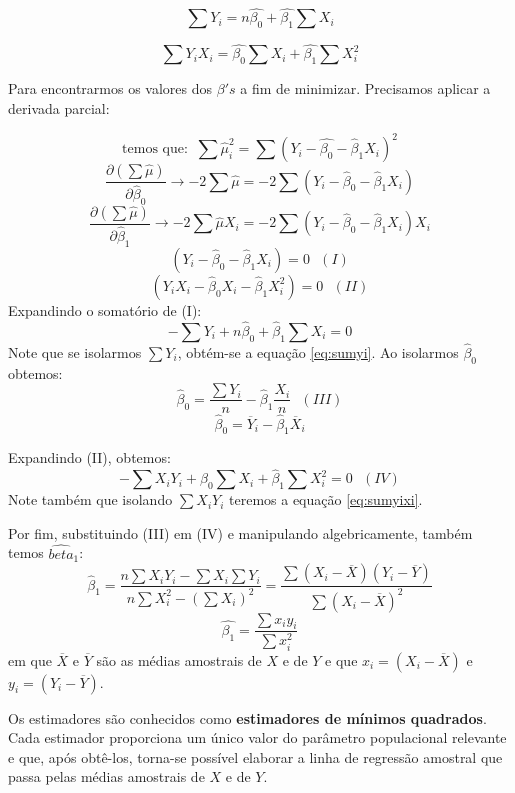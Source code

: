 \documentclass[
]{book}
\begin{document}
\begin{equation}
    \sum Y_i=n\hat{\beta_0} + \hat{\beta_1} \sum X_i
    \label{eq:sumyi}
\end{equation}

\begin{equation}
    \sum Y_i X_i=\hat{\beta_0} \sum X_i + \hat{\beta_1} \sum X_i^2
    \label{eq:sumyixi}
\end{equation}

Para encontrarmos os valores dos \(\beta's\) a fim de minimizar. Precisamos aplicar a derivada parcial:

\[\mbox{temos que:  }\ \sum\hat{\mu}_i^2=\sum(Y_i-\hat{\beta_0}-\hat{\beta}_1X_i)^2\]
\[\frac{\partial(\sum\hat{\mu})}{\partial \hat{\beta}_0}\rightarrow-2\sum\hat{\mu}=-2\sum(Y_i-\hat{\beta}_0-\hat{\beta}_1X_i)\]
\[\frac{\partial(\sum\hat{\mu})}{\partial \hat{\beta}_1}\rightarrow-2\sum\hat{\mu}X_i=-2\sum(Y_i-\hat{\beta}_0-\hat{\beta}_1X_i)X_i\]
\[(Y_i-\hat{\beta}_0-\hat{\beta}_1X_i)=0 \ \ \ (I)\]
\[(Y_i X_i-\hat{\beta}_0X_i-\hat{\beta}_1X_i^2)=0 \ \ \ (II)\]
Expandindo o somatório de (I):
\[-\sum Y_i+ n\hat{\beta}_0+\hat{\beta}_1\sum X_i=0\]
Note que se isolarmos \(\sum Y_i\), obtém-se a equação \eqref{eq:sumyi}. Ao isolarmos \(\hat{\beta}_0\) obtemos:
\[\hat{\beta}_0=\frac{\sum Y_i}{n}-\hat{\beta}_1\frac{X_i}{n} \ \ \ (III)\]
\begin{equation}
\hat{\beta}_0=\overline{Y}_i-\hat{\beta}_1\overline{X}_i
\label{eq:betazero}
\end{equation}

Expandindo (II), obtemos:
\[-\sum X_iY_i+\hat{\beta}_0\sum X_i+\hat{\beta}_1\sum X_i^2=0 \ \ \ (IV)\]
Note também que isolando \(\sum X_i Y_i\) teremos a equação \eqref{eq:sumyixi}.

Por fim, substituindo (III) em (IV) e manipulando algebricamente, também temos \(\hat{beta}_1\):
\[\hat{\beta}_1=\frac{n\sum X_iY_i-\sum X_i \sum Y_i}{n\sum X_i^2-(\sum X_i)^2}=\frac{\sum (X_i-\overline{X})(Y_i-\overline{Y})}{\sum(X_i-\overline{X})^2}\]
\begin{equation}
\hat{\beta_1}=\frac{\sum x_i y_i}{\sum x_i^2}
\label{eq:betaum}
\end{equation}
em que \(\overline{X}\) e \(\overline{Y}\) são as médias amostrais de \(X\) e de \(Y\) e que \(x_i=(X_i-\overline{X})\) e \(y_i=(Y_i-\overline{Y})\).

Os estimadores são conhecidos como \textbf{estimadores de mínimos quadrados}. Cada estimador proporciona um único valor do parâmetro populacional relevante e que, após obtê-los, torna-se possível elaborar a linha de regressão amostral que passa pelas médias amostrais de \(X\) e de \(Y\).
\end{document}
